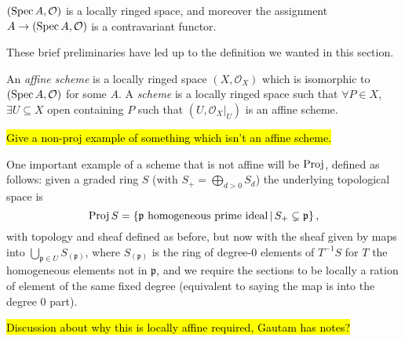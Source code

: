 \documentclass[000-main.tex]{subfiles}
\begin{document}
\begin{example}
	$(\operatorname{Spec} A, \mathcal{O})$ is a locally ringed space, and moreover the assignment $A \to (\operatorname{Spec} A , \mathcal{O})$ is a contravariant functor. 
\end{example}

These brief preliminaries have led up to the definition we wanted in this section. 

\begin{definition}
	An \emph{affine scheme} is a locally ringed space $(X, \mathcal{O}_X)$ which is isomorphic to $(\operatorname{Spec} A, \mathcal{O})$ for some $A$. A \emph{scheme} is a locally ringed space such that $\forall P \in X$, $\exists U \subseteq X$ open containing $P$ such that $(U, \left . \mathcal{O}_X \right \rvert_{U})$ is an affine scheme. 
\end{definition}

\begin{example}
	\hl{Give a non-proj example of something which isn't an affine scheme.} 
\end{example}

One important example of a scheme that is not affine will be $\operatorname{Proj}$, defined as follows: given a graded ring $S$ (with $S_+ = \bigoplus_{d > 0 } S_d$) the underlying topological space is 
\[
\operatorname{Proj} S = \left \lbrace \mathfrak{p} \text{ homogeneous prime ideal} \, | \, S_+ \subsetneq \mathfrak{p} \right \rbrace ,  
\] 
with topology and sheaf defined as before, but now with the sheaf given by maps into $\bigcup_{\mathfrak{p} \in U} S_{(\mathfrak{p})}$, where $S_{(\mathfrak{p})}$ is the ring of degree-0 elements of $T^{-1}S$ for $T$ the homogeneous elements not in $\mathfrak{p}$, and we require the sections to be locally a ration of element of the same fixed degree (equivalent to saying the map is into the degree 0 part). 

\hl{Discussion about why this is locally affine required, Gautam has notes?} 
\end{document}
